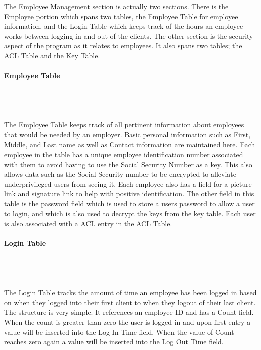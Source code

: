 \documentclass{report}
\begin{document}
        The Employee Management section is actually two sections. There is the Employee portion which
        spans two tables, the Employee Table for employee information, and the Login Table which
        keeps track of the hours an employee works between logging in and out of the clients. The
        other section is the security aspect of the program as it relates to employees. It also spans
        two tables; the ACL Table and the Key Table.\\
        \\
        {\bf Employee Table}\\
        \\
        \\
        \\
        \\
        The Employee Table keeps track of all pertinent information about employees that would
        be needed by an employer. Basic personal information such as First, Middle, and Last name
        as well as Contact information are maintained here. Each employee in the table has a unique
        employee identification number associated with them to avoid having to use the Social
        Security Number as a key. This also allows data such as the Social Security number to be
        encrypted to alleviate underprivileged users from seeing it. Each employee also has a
        field for a picture link and signature link to help with positive identification. The other
        field in this table is the password field which is used to store a users password to allow
        a user to login, and which is also used to decrypt the keys from the key table. Each user
        is also associated with a ACL entry in the ACL Table.\\
        \\
        {\bf Login Table}\\
        \\
        \\
        \\
        \\
        The Login Table tracks the amount of time an employee has been logged in based on when
        they logged into their first client to when they logout of their last client. The structure
        is very simple. It references an employee ID and has a Count field. When the count is greater
        than zero the user is logged in and upon first entry a value will be inserted into the
        Log In Time field. When the value of Count reaches zero again a value will be inserted into
        the Log Out Time field.
\end{document}
